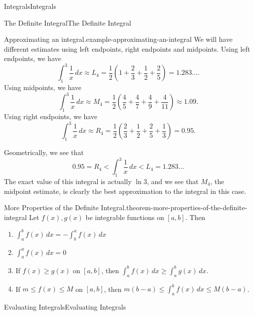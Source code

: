 \documentclass[10pt,]{book}
\numberwithin{equation}{section}
\begin{document}
\begin{chapterptx}{Integrals}{}{Integrals}{}{}
\begin{sectionptx}{The Definite Integral}{}{The Definite Integral}{}{}
\begin{example}{Approximating an integral.}{example-approximating-an-integral}
We will have different estimates using left endpoints, right endpoints and midpoints. Using left endpoints, we have%
\begin{equation*}
\int_{1}^{3}\frac{1}{x}\,dx \approx L_{4} = \frac{1}{2}\left(1 + \frac{2}{3} + \frac{1}{2} + \frac{2}{5}\right) = 1.283....
\end{equation*}
Using midpoints, we have%
\begin{equation*}
\int_{1}^{3}\frac{1}{x}\,dx \approx M_{4} = \frac{1}{2}\left(\frac{4}{5} + \frac{4}{7} + \frac{4}{9} + \frac{4}{11}\right) \approx1.09.
\end{equation*}
Using right endpoints, we have%
\begin{equation*}
\int_{1}^{3}\frac{1}{x}\,dx \approx R_{4} = \frac{1}{2}\left(\frac{2}{3} + \frac{1}{2} + \frac{2}{5} + \frac{1}{3}\right) = 0.95.
\end{equation*}
%
\par
\hypertarget{p-441}{}%
Geometrically, we see that%
\begin{equation*}
0.95 = R_{4} < \int_{1}^{3}\frac{1}{x}\,dx < L_{4} = 1.283...
\end{equation*}
The exact value of this integral is actually \(\ln 3\), and we see that \(M_{4}\), the midpoint estimate, is clearly the best approximation to the integral in this case.%
\end{example}
\begin{theorem}{More Properties of the Definite Integral.}{}{theorem-more-properties-of-the-definite-integral}%
\hypertarget{p-442}{}%
Let \(f(x),g(x)\) be integrable functions on \([a,b]\). Then \leavevmode%
\begin{enumerate}
\item\hypertarget{li-36}{}\(\int_{a}^{b}f(x)\,dx = - \int_{b}^{a}f(x)\,dx\)%
\item\hypertarget{li-37}{}\(\int_{a}^{a}f(x)\,dx = 0\)%
\item\hypertarget{li-38}{}If \(f(x)\geq g(x)\) on \([a,b]\), then \(\int_{a}^{b}f(x)\,dx \geq \int_{a}^{b}g(x)\,dx\).%
\item\hypertarget{li-39}{}If \(m\leq f(x)\leq M\) on \([a,b]\), then \(m(b-a)\leq \int_{a}^{b}f(x)\,dx\leq M(b-a)\).%
\end{enumerate}
%
\end{theorem}
\end{sectionptx}
%
%
\typeout{************************************************}
\typeout{************************************************}
%
\begin{sectionptx}{Evaluating Integrals}{}{Evaluating Integrals}{}{}\label{section-evaluating-integrals}

\end{sectionptx}
\end{chapterptx}
\end{document}
